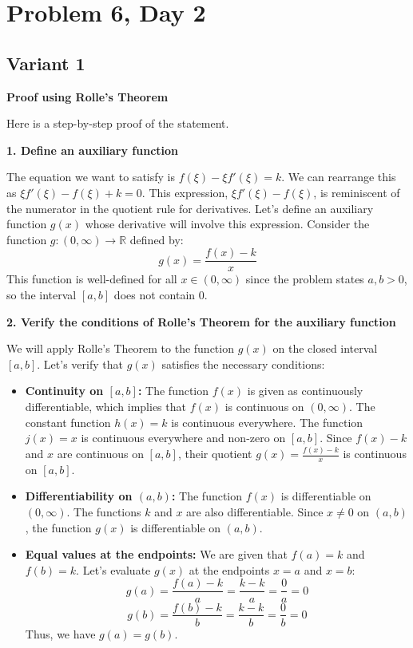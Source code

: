 \documentclass[12pt,a4paper]{article}
\theoremstyle{definition}
\begin{document}
\section{Problem 6, Day 2}
\subsection{Variant 1}
        \textbf{Proof using Rolle's Theorem}

        Here is a step-by-step proof of the statement.

        \textbf{1. Define an auxiliary function}

        The equation we want to satisfy is $f(\xi) - \xi f'(\xi) = k$. We can rearrange this as $\xi f'(\xi) - f(\xi) + k = 0$.
        This expression, $\xi f'(\xi) - f(\xi)$, is reminiscent of the numerator in the quotient rule for derivatives.
        Let's define an auxiliary function $g(x)$ whose derivative will involve this expression. Consider the function $g:(0, \infty) \to \mathbb{R}$ defined by:
        \[
            g(x) = \frac{f(x) - k}{x}
        \]
        This function is well-defined for all $x \in (0, \infty)$ since the problem states $a, b > 0$, so the interval $[a,b]$ does not contain $0$.

        \textbf{2. Verify the conditions of Rolle's Theorem for the auxiliary function}

        We will apply Rolle's Theorem to the function $g(x)$ on the closed interval $[a,b]$. Let's verify that $g(x)$ satisfies the necessary conditions:

        \begin{itemize}
            \item \textbf{Continuity on $[a,b]$:}
            The function $f(x)$ is given as continuously differentiable, which implies that $f(x)$ is continuous on $(0, \infty)$. The constant function $h(x)=k$ is continuous everywhere. The function $j(x)=x$ is continuous everywhere and non-zero on $[a,b]$.
            Since $f(x)-k$ and $x$ are continuous on $[a,b]$, their quotient $g(x) = \frac{f(x)-k}{x}$ is continuous on $[a,b]$.

            \item \textbf{Differentiability on $(a,b)$:}
            The function $f(x)$ is differentiable on $(0, \infty)$. The functions $k$ and $x$ are also differentiable. Since $x \neq 0$ on $(a,b)$, the function $g(x)$ is differentiable on $(a,b)$.

            \item \textbf{Equal values at the endpoints:}
            We are given that $f(a) = k$ and $f(b) = k$. Let's evaluate $g(x)$ at the endpoints $x=a$ and $x=b$:
            \[
                g(a) = \frac{f(a) - k}{a} = \frac{k - k}{a} = \frac{0}{a} = 0
            \]
            \[
                g(b) = \frac{f(b) - k}{b} = \frac{k - k}{b} = \frac{0}{b} = 0
            \]
            Thus, we have $g(a) = g(b)$.
        \end{itemize}
\end{document}
